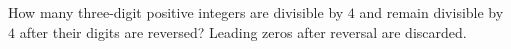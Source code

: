 How many three-digit positive integers are divisible by $4$ and remain divisible by $4$ after their digits are reversed? Leading zeros after reversal are discarded.
